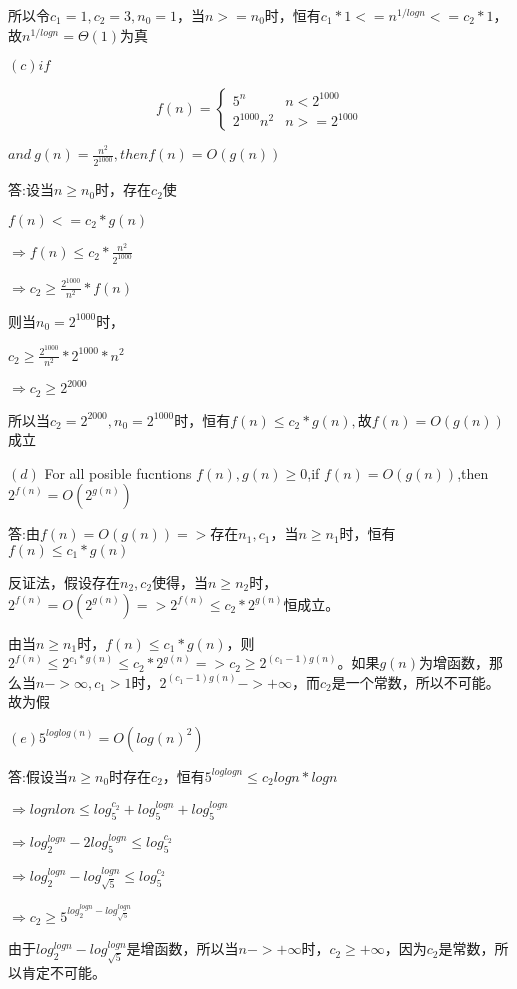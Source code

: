 \documentclass[
]{ctexart}
\begin{document}
所以令\(c_1=1,c_2=3,n_0=1\)，当\(n>=n_0\)时，恒有\(c_1*1<=n^{1/logn}<=c_2*1\)，故\(n^{1/logn}=\Theta(1)\)为真

\((c)if\)

\[f(n)=\begin{cases}
5^n & n<2^{1000} \\
2^{1000}n^2 & n>=2^{1000}
\end{cases}\]

\(and \ g(n)=\frac{n^2}{2^{1000}},then f(n)=O(g(n))\)

答:设当\(n\geq  n_0\)时，存在\(c_2\)使

\(f(n)<=c_2*g(n)\)

\(\Rightarrow f(n)\leq c_2*\frac{n^2}{2^{1000}}\)

\(\Rightarrow c_2\geq\frac{2^{1000}}{n^2}*f(n)\)

则当\(n_0=2^{1000}\)时，

\(c_2\geq\frac{2^{1000}}{n^2}*2^{1000}*n^2\)

\(\Rightarrow c_2\geq 2^{2000}\)

所以当\(c_2=2^{2000},n_0=2^{1000}\)时，恒有\(f(n)\leq c_2*g(n),故f(n)=O(g(n))\)成立

\((d)\) For all posible fucntions \(f(n),g(n)\geq 0\),if
\(f(n)=O(g(n))\),then \(2^{f(n)}=O(2^{g(n)})\)

答:由\(f(n)=O(g(n))=>存在n_1,c_1\)，当\(n\geq n_1\)时，恒有\(f(n)\leq c_1*g(n)\)

反证法，假设存在\(n_2,c_2\)使得，当\(n\geq n_2\)时，\(2^{f(n)}=O(2^{g(n)})=>2^{f(n)}\leq c_2*2^{g(n)}\)恒成立。

由当\(n\geq  n_1\)时，\(f(n)\leq  c_1*g(n)\)，则\(2^{f(n)}\leq2^{c_1*g(n)}\leq c_2*2^{g(n)}=>c_2\geq 2^{(c_1-1)g(n)}\)。如果\(g(n)\)为增函数，那么当\(n->∞,c_1>1\)时，\(2^{(c_1-1)g(n)}->+∞\)，而\(c_2\)是一个常数，所以不可能。故为假

\((e)5^{loglog(n)}=O(log(n)^2)\)

答:假设当\(n\geq n_0\)时存在\(c_2\)，恒有\(5^{loglogn}\leq c_2logn*logn\)

\(\Rightarrow lognlon\leq log_5^{c_2}+log_5^{logn}+log_5^{logn}\)

\(\Rightarrow log_2^{logn}-2log_5^{logn}\leq log_5^{c_2}\)

\(\Rightarrow log_2^{logn}-log_{\sqrt{5}}^{logn}\leq log_5^{c_2}\)

\(\Rightarrow c_2\geq 5^{log_2^{logn}-log_{\sqrt{5}}^{logn}}\)

由于\(log_{2}^{logn}-log_{\sqrt{5}}^{logn}\)是增函数，所以当\(n->+∞\)时，\(c_2\geq+∞\)，因为\(c_2\)是常数，所以肯定不可能。
\end{document}
